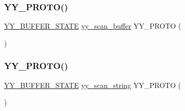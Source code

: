 \subsubsection{\texorpdfstring{Y\+Y\+\_\+\+P\+R\+O\+T\+O()}{YY\_PROTO()}\hspace{0.1cm}{\footnotesize\ttfamily [7/9]}}
{\footnotesize\ttfamily \mbox{\hyperlink{expr-lex_8cpp_a4e5bd2d129903df83f3d13effaf8f3e4}{Y\+Y\+\_\+\+B\+U\+F\+F\+E\+R\+\_\+\+S\+T\+A\+TE}} \mbox{\hyperlink{expr-lex_8cpp_af9ed770023a73cfa0b6cfd90b5a76fc9}{yy\+\_\+scan\+\_\+buffer}} Y\+Y\+\_\+\+P\+R\+O\+TO (\begin{DoxyParamCaption}\item[{(char $\ast$base, \mbox{\hyperlink{expr-lex_8cpp_aa14cc3d400000eef0cd40225fd790cfe}{yy\+\_\+size\+\_\+t}} \mbox{\hyperlink{expr-lex_8cpp_ab7d671599a7b25ca99a487fa341bc33a}{size}})}]{ }\end{DoxyParamCaption})}

\mbox{\label{expr-lex_8cpp_a689b8676764ac30cbf27edfb45c74391}} 
\subsubsection{\texorpdfstring{Y\+Y\+\_\+\+P\+R\+O\+T\+O()}{YY\_PROTO()}\hspace{0.1cm}{\footnotesize\ttfamily [8/9]}}
{\footnotesize\ttfamily \mbox{\hyperlink{expr-lex_8cpp_a4e5bd2d129903df83f3d13effaf8f3e4}{Y\+Y\+\_\+\+B\+U\+F\+F\+E\+R\+\_\+\+S\+T\+A\+TE}} \mbox{\hyperlink{expr-lex_8cpp_ac0d3a22f8bc4cc5e7af2783fe375d5b0}{yy\+\_\+scan\+\_\+string}} Y\+Y\+\_\+\+P\+R\+O\+TO (\begin{DoxyParamCaption}\item[{(\mbox{\hyperlink{expr-lex_8cpp_aa2f1a918be586b44bf08126bde2d7cc9}{yyconst}} char $\ast$yy\+\_\+str)}]{ }\end{DoxyParamCaption})}

\mbox{\label{expr-lex_8cpp_a0a2ce3902c765bc21ae783522d579223}} 
